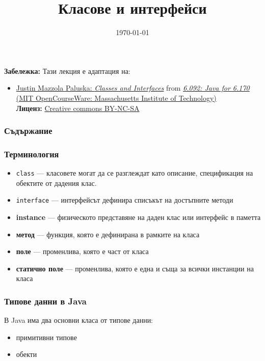 \documentclass[ignorenonframetext, hyperref=unicode,compress]{beamer}
\title{Класове и интерфейси}
\date{\today}
\begin{document}
\frame{\titlepage}

\begin{frame}
\small
{\bf Забележка:} Тази лекция е адаптация на:
\begin{itemize}
  \item \href{http://ocw.mit.edu/NR/rdonlyres/Electrical-Engineering-and-Computer-Science/6-092January--IAP--2006/66BAC837-433E-48A5-BA15-B766E0B7CDEA/0/lecture2a.pdf}{Justin Mazzola Paluska: {\em Classes and Interfaces}} from
\href{http://ocw.mit.edu/OcwWeb/Electrical-Engineering-and-Computer-Science/6-092January--IAP--2006/CourseHome/index.htm}{
{\em 6.092: Java for 6.170} (MIT OpenCourseWare:
Massachusetts Institute of Technology)}\\
{\bf Лиценз:}
\href{http://ocw.mit.edu/OcwWeb/web/terms/terms/index.htm\#cc}{Creative commons
BY-NC-SA}  

\end{itemize}

\end{frame}
\begin{frame}
\frametitle{Съдържание}
\tableofcontents %
\end{frame}



\begin{frame}[containsverbatim]\frametitle{Терминология}
\begin{itemize}
 \item \lstinline{class} --- класовете могат да се разглеждат като описание, спецификация на обектите от дадения клас.
 \item \lstinline{interface} --- интерфейсът дефинира списъкът на достъпните методи
 \item {\bfseries instance} --- физическото представяне на даден клас или интерфейс в паметта
\end{itemize}

\begin{itemize}
 \item {\bfseries метод} --- функция, която е дефинирана в рамките на класа
 \item {\bfseries поле} --- променлива, която е част от класа
 \item {\bfseries статично поле} --- променлива, която е една и съща за всички инстанции на класа
\end{itemize}

\end{frame}


\begin{frame}[containsverbatim]\frametitle{Типове данни в Java}
В Java има два основни класа от типове данни:
\begin{itemize}
 \item примитивни типове
 \item обекти
\end{itemize}

\end{frame}
\end{document}
